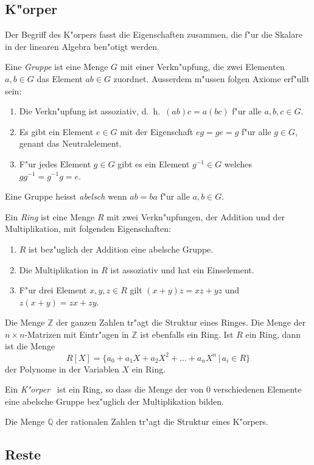 \subsection{K"orper}
Der Begriff des K"orpers fasst die Eigenschaften zusammen, die f"ur
die Skalare in der linearen Algebra ben"otigt werden.

Eine {\em Gruppe} ist eine Menge $G$ mit einer Verkn"upfung, die zwei Elementen
$a,b\in G$ das Element $ab\in G$ zuordnet.
Ausserdem m"ussen folgen Axiome erf"ullt sein:
\begin{enumerate}[label={\bf G.\arabic*},itemsep=0mm]
\item
Die Verkn"upfung ist assoziativ, d.~h.~$(ab)c=a(bc)$ f"ur alle $a,b,c\in G$.
\item
Es gibt ein Element $e\in G$ mit der Eigenschaft $eg=ge=g$ f"ur alle $g\in G$,
genant das Neutralelement.
\item
F"ur jedes Element $g\in G$ gibt es ein Element $g^{-1}\in G$ welches
$gg^{-1}=g^{-1}g=e$.
\end{enumerate}
Eine Gruppe heisst {\em abelsch} wenn $ab=ba$ f"ur alle $a,b\in G$.

Ein {\em Ring} ist eine Menge $R$ mit zwei Verkn"upfungen, der Addition
und der Multiplikation, mit folgenden Eigenschaften:
\begin{enumerate}[label={\bf R.\arabic*},itemsep=0mm]
\item $R$ ist bez"uglich der Addition eine abelsche Gruppe.
\item Die Multiplikation in $R$ ist assoziativ und hat ein Einselement.
\item F"ur drei Element $x,y,z\in R$ gilt $(x+y)z=xz+yz$ und
$z(x+y)=zx+zy$.
\end{enumerate}

Die Menge $\mathbb Z$ der ganzen Zahlen tr"agt die Struktur eines Ringes.
Die Menge der $n\times n$-Matrizen mit Eintr"agen in $\mathbb Z$ ist ebenfalls
ein Ring.
Ist $R$ ein Ring, dann ist die Menge 
\[
R[X]=\{ a_0+a_1X +a_2X^2+\dots +a_nX^n\,|\,a_i\in R\}
\]
der Polynome in der Variablen $X$ ein Ring.

Ein {\em K"orper}  ist ein Ring, so dass die Menge der von $0$ verschiedenen
Elemente eine abelsche Gruppe bez"uglich der Multiplikation bilden.

Die Menge $\mathbb Q$ der rationalen Zahlen tr"agt die Struktur eines
K"orpers.

\subsection{Reste}


